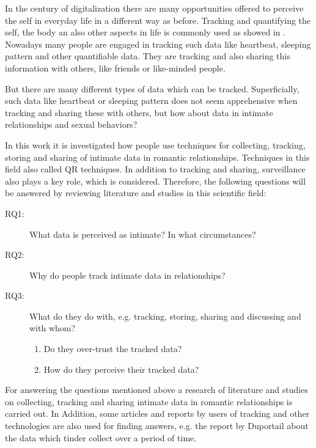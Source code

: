 
In the century of digitalization there are many opportunities offered to perceive the self in everyday life in a different way as before. Tracking and quantifying the self, the body an also other aspects in life is commonly used as showed in \cite{kelly2017inevitable}. Nowadays many people are engaged in tracking such data like heartbeat, sleeping pattern and other quantifiable data. They are tracking and also sharing this information with others, like friends or like-minded people. 



But there are many different types of data which can be tracked. Superficially, such data like heartbeat or sleeping pattern does not seem apprehensive when tracking and sharing these with others, but how about data in intimate relationships and sexual behaviors?


In this work it is investigated how people use techniques for collecting, tracking, storing and sharing of intimate data in romantic relationships. Techniques in this field also called \acl{QR} techniques. In addition to tracking and sharing, surveillance also plays a key role, which is considered.
Therefore, the following questions will be answered by reviewing literature and studies in this scientific field:
 \begin{description}
 	\item[RQ1:] What data is perceived as intimate? In what circumstances?
 	\item[RQ2:] Why do people track intimate data in relationships?
 	\item[RQ3:] What do they do with, e.g. tracking, storing, sharing and discussing and with whom?
 	\begin{enumerate}
 		\item Do they over-trust the tracked data?
 		\item How do they perceive their tracked data?
 	\end{enumerate}
 \end{description}
For answering the questions mentioned above a research of literature and studies on collecting, tracking and sharing intimate data in romantic relationships is carried out. In Addition, some articles and reports by users of tracking and other technologies are also used for finding answers, e.g. the report by Duportail \cite{Duportail2017} about the data which tinder collect over a period of time.

